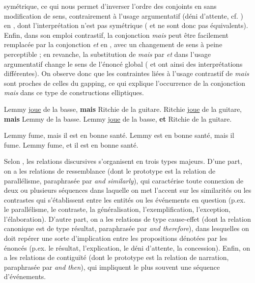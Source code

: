 symétrique, ce qui nous permet d’inverser l’ordre des conjoints en  sans modification de sens, contrairement à l’usage argumentatif (déni d’attente, cf. \citealt{Lakoff1971}) en , dont l’interprétation n’est pas symétrique ( et  ne sont donc pas équivalents). Enfin, dans son emploi contrastif, la conjonction \textit{mais} peut être facilement remplacée par la conjonction \textit{et} en , avec un changement de sens à peine perceptible ; en revanche, la substitution de \textit{mais} par \textit{et} dans l’usage argumentatif change le sens de l’énoncé global ( et  ont ainsi des interprétations différentes). On observe donc que les contraintes liées à l’usage contrastif de \textit{mais} sont proches de celles du gapping, ce qui explique l’occurrence de la conjonction \textit{mais} dans ce type de constructions elliptiques. 

\largerpage
\ea
\ea Lemmy \uline{joue} de la basse, \textbf{mais} Ritchie de la guitare. \label{ch2:ex162a}
\ex Ritchie \uline{joue} de la guitare, \textbf{mais} Lemmy de la basse. \label{ch2:ex162b} 
\ex Lemmy \uline{joue} de la basse, \textbf{et} Ritchie de la guitare. \citep[42]{Winterstein2010} \label{ch2:ex162c} 
\z
\z

\ea
\ea Lemmy fume, mais il est en bonne santé. \label{ch2:ex163a}
\ex Lemmy est en bonne santé, mais il fume. \label{ch2:ex163b} 
\ex Lemmy fume, et il est en bonne santé. \citep[43]{Winterstein2010} \label{ch2:ex163c} 
\z
\z

Selon \citet{Kehler2000,Kehler2002}, les relations discursives s’organisent en trois types majeurs. D’une part, on a les relations de ressemblance (dont le prototype est la relation de parallélisme, paraphrasée par \textit{and similarly}), qui caractérise toute connexion de deux ou plusieurs séquences dans laquelle on met l’accent sur les similarités ou les contrastes qui s’établissent entre les entités ou les événements en question (p.ex. le parallélisme, le contraste, la généralisation, l’exemplification, l’exception, l’élaboration). D’autre part, on a les relations de type cause-effet (dont la relation canonique est de type résultat, paraphrasée par \textit{and therefore}), dans lesquelles on doit repérer une sorte d’implication entre les propositions dénotées par les énoncés (p.ex. le résultat, l’explication, le déni d’attente, la concession). Enfin, on a les relations de contiguïté (dont le prototype est la relation de narration, paraphrasée par \textit{and then}), qui impliquent le plus souvent une séquence d’événements. 

